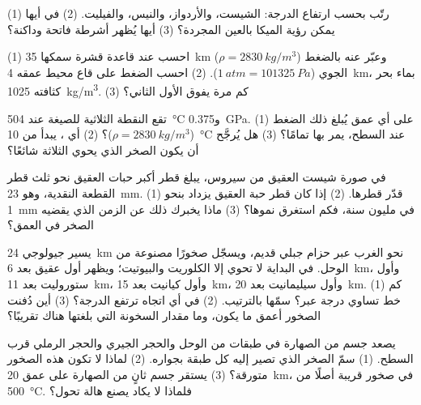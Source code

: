 \begin{exercise}[$\star$]\label{exo:g12:metamorphic-rocks:5}
(1) رتّب بحسب ارتفاع الدرجة: الشيست، والأردواز، والنيس، والفيليت. (2) في
أيها يمكن رؤية الميكا بالعين المجردة؟ (3) أيها يُظهر
أشرطة فاتحة وداكنة؟
\end{exercise}

\begin{exercise}[$\star\star$]\label{exo:g12:metamorphic-rocks:6}
(1) احسب  عند قاعدة قشرة سمكها \qty{35}{km}
($\rho = \qty{2830}{kg/m^3}$) وعبّر عنه بالضغط الجوي
($\qty{1}{atm} = \qty{101325}{Pa}$). (2) احسب الضغط على قاع
محيط عمقه \qty{4}{km}، بماء بحر كثافته
\qty{1025}{kg/m^3}. (3) كم مرة يفوق الأول الثاني؟
\end{exercise}

\begin{exercise}[$\star\star$]\label{exo:g12:metamorphic-rocks:7}
تقع النقطة الثلاثية للصيغة  عند \qty{504}{\celsius}
و\qty{0.375}{GPa}. (1) على أي عمق يُبلغ ذلك الضغط ($\rho =
\qty{2830}{kg/m^3}$)؟ (2) أي ، يبدأ من
\qty{10}{\celsius} عند السطح، يمر بها تمامًا؟ (3) هل يُرجَّح أن يكون الصخر
الذي يحوي  الثلاثة شائعًا؟
\end{exercise}

\begin{exercise}[$\star\star$]\label{exo:g12:metamorphic-rocks:8}
في صورة شيست العقيق من سيروس، يبلغ قطر أكبر حبات العقيق
نحو ثلث قطر القطعة النقدية، وهو \qty{23}{mm}. (1) قدّر
قطرها. (2) إذا كان قطر حبة العقيق يزداد بنحو \qty{1}{mm} في
مليون سنة، فكم استغرق نموها؟ (3) ماذا يخبرك ذلك
عن الزمن الذي يقضيه الصخر في العمق؟
\end{exercise}

\begin{exercise}[$\star\star$]\label{exo:g12:metamorphic-rocks:9}
يسير جيولوجي \qty{24}{km} نحو الغرب عبر حزام جبلي قديم،
ويسجّل صخورًا مصنوعة من الوحل. في البداية لا تحوي إلا الكلوريت والبيوتيت؛
ويظهر أول عقيق بعد \qty{6}{km}، وأول ستوروليت بعد
\qty{11}{km}، وأول كيانيت بعد \qty{15}{km}، وأول سيليمانيت
بعد \qty{20}{km}. (1) كم خط تساوي درجة عبر؟ سمّها بالترتيب.
(2) في أي اتجاه ترتفع الدرجة؟ (3) أين دُفنت الصخور
أعمق ما يكون، وما مقدار السخونة التي بلغتها هناك تقريبًا؟
\end{exercise}

\begin{exercise}[$\star\star$]\label{exo:g12:metamorphic-rocks:10}
يصعد جسم من الصهارة في طبقات من الوحل والحجر الجيري والحجر الرملي قرب
السطح. (1) سمّ الصخر الذي تصير إليه كل طبقة بجواره. (2) لماذا لا تكون هذه
الصخور متورقة؟ (3) يستقر جسم ثانٍ من الصهارة على عمق \qty{20}{km}، في
صخور قريبة أصلًا من \qty{500}{\celsius}. فلماذا لا يكاد يصنع هالة تحول؟
\end{exercise}

